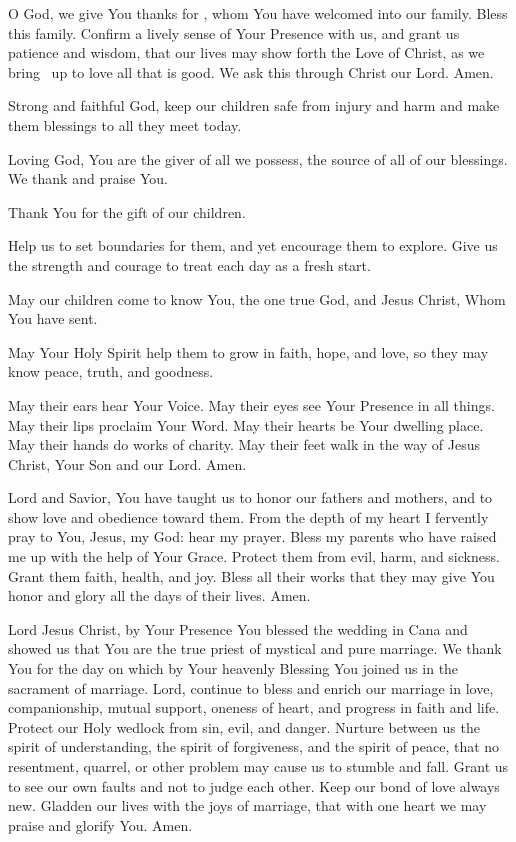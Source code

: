 O God, we give You thanks for \mychildren, whom You have welcomed into our family.
Bless this family.
Confirm a lively sense of Your Presence with us, and grant us patience and wisdom, that our lives may show forth the Love of Christ, as we bring \mychildren\ up to love all that is good.
We ask this through Christ our Lord.
Amen.

\label{prayer:safety_children}
Strong and faithful God, keep our children safe from injury and harm and make them blessings to all they meet today.

\label{prayer:parent}
Loving God, You are the giver of all we possess, the source of all of our blessings.
We thank and praise You.

Thank You for the gift of our children.

Help us to set boundaries for them, and yet encourage them to explore.
Give us the strength and courage to treat each day as a fresh start.

May our children come to know You, the one true God, and Jesus Christ, Whom You have sent.

May Your Holy Spirit help them to grow in faith, hope, and love, so they may know peace, truth, and goodness.

May their ears hear Your Voice.
May their eyes see Your Presence in all things.
May their lips proclaim Your Word.
May their hearts be Your dwelling place.
May their hands do works of charity.
May their feet walk in the way of Jesus Christ, Your Son and our Lord.
Amen.

Lord and Savior, You have taught us to honor our fathers and mothers, and to show love and obedience toward them.
From the depth of my heart I fervently pray to You, Jesus, my God: hear my prayer.
Bless my parents who have raised me up with the help of Your Grace.
Protect them from evil, harm, and sickness.
Grant them faith, health, and joy.
Bless all their works that they may give You honor and glory all the days of their lives.
Amen.

Lord Jesus Christ, by Your Presence You blessed the wedding in Cana and showed us that You are the true priest of mystical and pure marriage.
We thank You for the day on which by Your heavenly Blessing You joined us in the sacrament of marriage.
Lord, continue to bless and enrich our marriage in love, companionship, mutual support, oneness of heart, and progress in faith and life.
Protect our Holy wedlock from sin, evil, and danger.
Nurture between us the spirit of understanding, the spirit of forgiveness, and the spirit of peace, that no resentment, quarrel, or other problem may cause us to stumble and fall.
Grant us to see our own faults and not to judge each other.
Keep our bond of love always new.
Gladden our lives with the joys of marriage, that with one heart we may praise and glorify You.
Amen.

